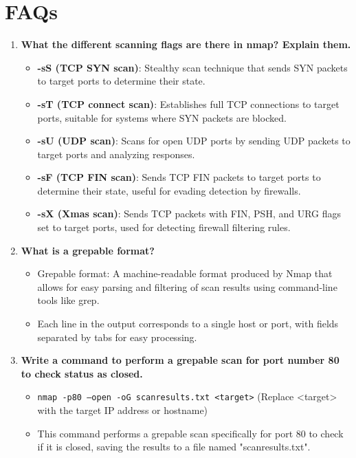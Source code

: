 \documentclass[11pt]{article}
\begin{document}
\section{FAQs}
\begin{enumerate}
    \item \textbf{What the different scanning flags are there in nmap? Explain them.}
          \begin{itemize}
              \item \textbf{-sS (TCP SYN scan)}: Stealthy scan technique that sends SYN packets to target ports to determine their state.
              \item \textbf{-sT (TCP connect scan)}: Establishes full TCP connections to target ports, suitable for systems where SYN packets are blocked.
              \item \textbf{-sU (UDP scan)}: Scans for open UDP ports by sending UDP packets to target ports and analyzing responses.
              \item \textbf{-sF (TCP FIN scan)}: Sends TCP FIN packets to target ports to determine their state, useful for evading detection by firewalls.
              \item \textbf{-sX (Xmas scan)}: Sends TCP packets with FIN, PSH, and URG flags set to target ports, used for detecting firewall filtering rules.
          \end{itemize}

    \item \textbf{What is a grepable format?}
          \begin{itemize}
              \item Grepable format: A machine-readable format produced by Nmap that allows for easy parsing and filtering of scan results using command-line tools like grep.
              \item Each line in the output corresponds to a single host or port, with fields separated by tabs for easy processing.
          \end{itemize}

    \item \textbf{Write a command to perform a grepable scan for port number 80 to check status as closed.}
          \begin{itemize}
              \item \texttt{nmap -p80 --open -oG scanresults.txt <target>} (Replace <target> with the target IP address or hostname)
              \item This command performs a grepable scan specifically for port 80 to check if it is closed, saving the results to a file named "scanresults.txt".
          \end{itemize}
\end{enumerate}
\end{document}
